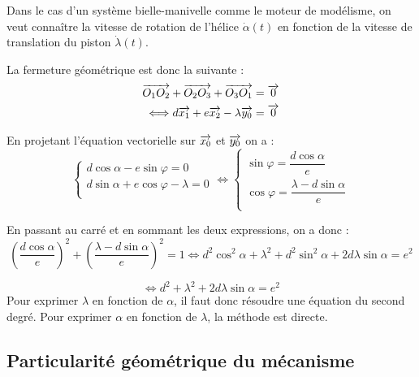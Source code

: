 \documentclass[10pt,oneside]{article}
\begin{document}
\begin{exemple}


Dans le cas d'un système bielle-manivelle comme le moteur de modélisme, on veut connaître la vitesse de rotation de l'hélice $\dot{\alpha}(t)$ en fonction de la vitesse de translation du piston $\dot{\lambda}(t)$. 

La fermeture géométrique est donc la suivante : 
\begin{eqnarray*}
\overrightarrow{O_1 O_2} + \overrightarrow{O_2 O_3} +\overrightarrow{O_3 O_1} = \overrightarrow{0} \\
\Longleftrightarrow d\overrightarrow{x_1} + e \overrightarrow{x_2} - \lambda \overrightarrow{y_0}  = \overrightarrow{0}
\end{eqnarray*}



En projetant l'équation vectorielle sur $\overrightarrow{x_0}$ et $\overrightarrow{y_0}$ on a : 
$$
\left\{
\begin{array}{l}
d\cos\alpha - e \sin \varphi = 0 \\
d\sin\alpha + e \cos \varphi - \lambda= 0 \\
\end{array}
\right.
\Longleftrightarrow 
\left\{
\begin{array}{l}
\sin \varphi = \dfrac{d\cos\alpha}{e}  \\
\cos \varphi = \dfrac{\lambda - d\sin\alpha}{e} \\
\end{array}
\right.
$$

En passant au carré et en sommant les deux expressions, on a donc : 
$$
\left(\dfrac{d\cos\alpha}{e}\right)^2 + \left(\dfrac{\lambda - d\sin\alpha}{e}\right)^2 = 1 
\Longleftrightarrow
d^2\cos^2\alpha + \lambda^2 + d^2\sin^2\alpha +2d\lambda\sin\alpha = e^2
$$

$$
\Longleftrightarrow
d^2+ \lambda^2 +2d\lambda\sin\alpha = e^2
$$
Pour exprimer $\lambda$ en fonction de $\alpha$, il faut donc résoudre une équation du second degré. Pour exprimer $\alpha$ en fonction de $\lambda$, la méthode est directe. 


\end{exemple}



\subsection{Particularité géométrique du mécanisme}
\end{document}
